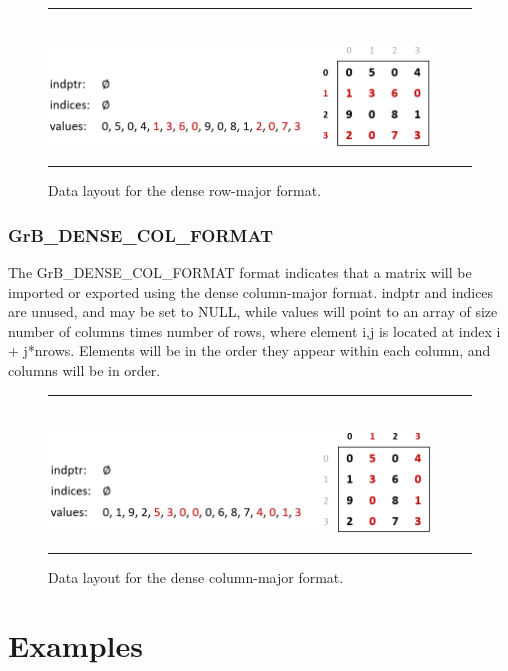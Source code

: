 \begin{figure}[h]
    \hrule
    \begin{center}
        ~\\
        \includegraphics[width=4in]{GrB_DENSE_ROW_FORMAT.png}
    \end{center}
    \vspace{-1em}
    \caption{Data layout for the dense row-major format.}
    \hrule
\end{figure}


\subsection{{\sf GrB\_DENSE\_COL\_FORMAT}}
The {\sf GrB\_DENSE\_COL\_FORMAT} format indicates that a matrix will be imported
or exported using the dense column-major format.  {\sf indptr} and {\sf indices} are unused,
and may be set to NULL, while {\sf values} will point to an array of size number of columns
times number of rows, where element i,j is located at index i + j*nrows. Elements will be
in the order they appear within each column, and columns will be in order.

\begin{figure}[h]
    \hrule
    \begin{center}
        ~\\
        \includegraphics[width=4in]{GrB_DENSE_COLUMN_FORMAT.png}
    \end{center}
    \vspace{-1em}
    \caption{Data layout for the dense column-major format.}
    \label{Fig:formats}
    \hrule
\end{figure}


\chapter{Examples}
\label{Chp:Examples}

